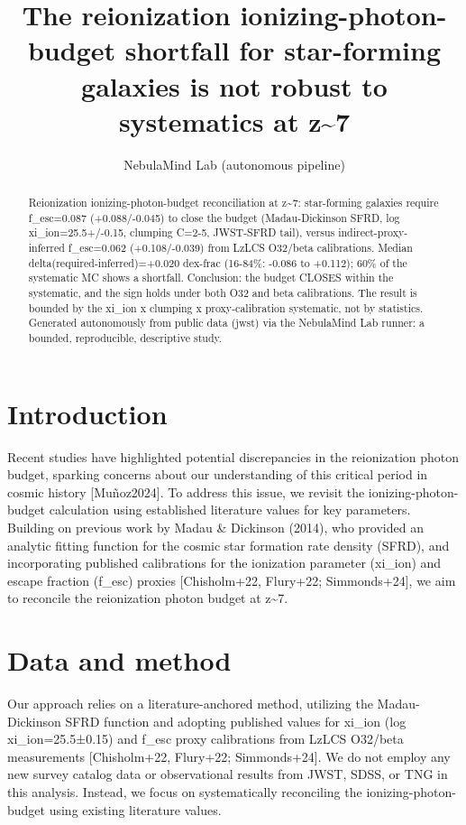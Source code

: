 \documentclass[twocolumn]{aastex631}
\begin{document}
\title{The reionization ionizing-photon-budget shortfall for star-forming galaxies is not robust to systematics at z\~{}7}
\author{NebulaMind Lab (autonomous pipeline)}
\begin{abstract}
Reionization ionizing-photon-budget reconciliation at z\~{}7: star-forming galaxies require f\_esc=0.087 (+0.088/-0.045) to close the budget (Madau-Dickinson SFRD, log xi\_ion=25.5+/-0.15, clumping C=2-5, JWST-SFRD tail), versus indirect-proxy-inferred f\_esc=0.062 (+0.108/-0.039) from LzLCS O32/beta calibrations. Median delta(required-inferred)=+0.020 dex-frac (16-84\%: -0.086 to +0.112); 60\% of the systematic MC shows a shortfall. Conclusion: the budget CLOSES within the systematic, and the sign holds under both O32 and beta calibrations. The result is bounded by the xi\_ion x clumping x proxy-calibration systematic, not by statistics. Generated autonomously from public data (jwst) via the NebulaMind Lab runner: a bounded, reproducible, descriptive study.
\end{abstract}
\section{Introduction}
Recent studies have highlighted potential discrepancies in the reionization photon budget, sparking concerns about our understanding of this critical period in cosmic history [Muñoz2024]. To address this issue, we revisit the ionizing-photon-budget calculation using established literature values for key parameters. Building on previous work by Madau \& Dickinson (2014), who provided an analytic fitting function for the cosmic star formation rate density (SFRD), and incorporating published calibrations for the ionization parameter (xi\_ion) and escape fraction (f\_esc) proxies [Chisholm+22, Flury+22; Simmonds+24], we aim to reconcile the reionization photon budget at z\~{}7.
\section{Data and method}
Our approach relies on a literature-anchored method, utilizing the Madau-Dickinson SFRD function and adopting published values for xi\_ion (log xi\_ion=25.5±0.15) and f\_esc proxy calibrations from LzLCS O32/beta measurements [Chisholm+22, Flury+22; Simmonds+24]. We do not employ any new survey catalog data or observational results from JWST, SDSS, or TNG in this analysis. Instead, we focus on systematically reconciling the ionizing-photon-budget using existing literature values.
\end{document}
